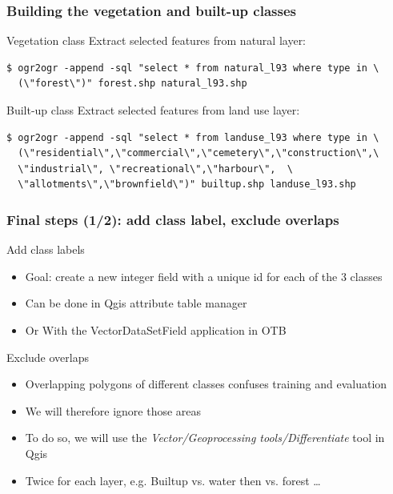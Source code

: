 \documentclass[8pt]{beamer}
\begin{document}
\begin{frame}[fragile]
\frametitle{Building the vegetation and built-up classes}
\begin{block}{Vegetation class}
Extract selected features from natural layer:
\begin{scriptsize}
\begin{verbatim}
$ ogr2ogr -append -sql "select * from natural_l93 where type in \
  (\"forest\")" forest.shp natural_l93.shp
\end{verbatim}
\end{scriptsize}
\end{block}

\begin{block}{Built-up class}
Extract selected features from land use layer:
\begin{scriptsize}
\begin{verbatim}
$ ogr2ogr -append -sql "select * from landuse_l93 where type in \
  (\"residential\",\"commercial\",\"cemetery\",\"construction\",\
  \"industrial\", \"recreational\",\"harbour\",  \
  \"allotments\",\"brownfield\")" builtup.shp landuse_l93.shp
\end{verbatim}
\end{scriptsize}
\end{block}
\end{frame}

\begin{frame}[fragile]
\frametitle{Final steps (1/2): add class label, exclude overlaps}

\begin{block}{Add class labels}
\begin{itemize}
\item Goal: create a new integer field with a unique id for each of the 3 classes
\item Can be done in Qgis attribute table manager
\item Or With the VectorDataSetField application in OTB
\end{itemize}
\end{block}

\begin{block}{Exclude overlaps}
\begin{itemize}
\item Overlapping polygons of different classes confuses training and evaluation
\item We will therefore ignore those areas
\item To do so, we will use the \textit{Vector/Geoprocessing tools/Differentiate} tool in Qgis
\item Twice for each layer, e.g. Builtup vs. water then vs. forest \ldots
\end{itemize}
\end{block}
\end{frame}
\end{document}
